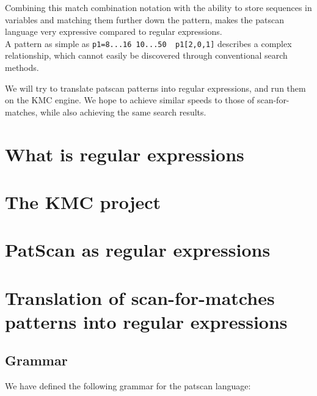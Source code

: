 \documentclass[12pt]{article}
\begin{document}
Combining this match combination notation with the ability to store sequences in variables and matching them further down the pattern, makes the patscan language very expressive compared to regular expressions. \\
A pattern as simple as \texttt{p1=8...16 10...50 ~p1[2,0,1]} describes a complex relationship, which cannot easily be discovered through conventional search methods.

We will try to translate patscan patterns into regular expressions, and run them on the KMC engine. We hope to achieve similar speeds to those of scan-for-matches, while also achieving the same search results.

\newpage

\section{What is regular expressions}

\newpage

\section{The KMC project}

\newpage

\section{PatScan as regular expressions}

\newpage

\section{Translation of scan-for-matches patterns into regular expressions}

\subsection{Grammar}
\label{Patscan grammar}

We have defined the following grammar for the patscan language: \\
\end{document}

